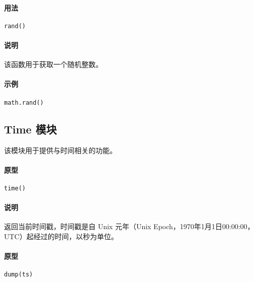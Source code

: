 \paragraph{用法}
\begin{lstlisting}[language=berry, numbers=none]
rand()
\end{lstlisting}

\paragraph{说明}
该函数用于获取一个随机整数。

\paragraph{示例}
\begin{lstlisting}[language=berry, numbers=none]
math.rand()
\end{lstlisting}

\subsection{Time 模块}

该模块用于提供与时间相关的功能。


\paragraph{原型}
\begin{lstlisting}[language=berry, numbers=none]
time()
\end{lstlisting}

\paragraph{说明}
返回当前时间戳，时间戳是自 Unix 元年（Unix Epoch，1970年1月1日00:00:00，UTC）起经过的时间，以秒为单位。


\paragraph{原型}
\begin{lstlisting}[language=berry, numbers=none]
dump(ts)
\end{lstlisting}


